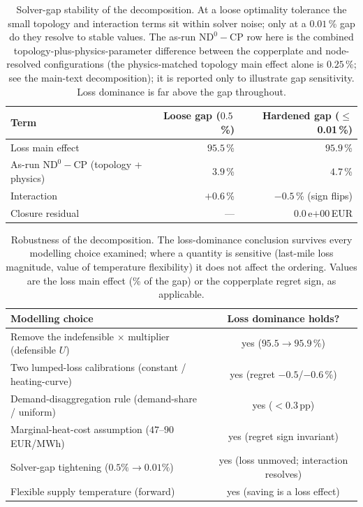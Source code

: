 \documentclass[11pt,a4paper]{article}
\newcommand{\CP}{\ensuremath{\mathrm{CP}}}
\newcommand{\NDz}{\ensuremath{\mathrm{ND^{0}}}}
\begin{document}
\begin{table}[t]
\centering
\caption{Solver-gap stability of the decomposition. At a loose optimality tolerance the
small topology and interaction terms sit within solver noise; only at a
$0.01$\,\% gap do they resolve to stable values. The as-run $\NDz\!-\!\CP$ row here is the
combined topology-plus-physics-parameter difference between the copperplate and node-resolved
configurations (the physics-matched topology main effect alone is $0.25$\,\%; see the main-text
decomposition); it is reported only to illustrate gap sensitivity. Loss dominance is far above the
gap throughout.}
\label{tab:gapstability}
\begin{tabular}{lrr}
\hline
Term & Loose gap ($0.5$\,\%) & Hardened gap ($\le$0.01\,\%) \\
\hline
Loss main effect & $95.5$\,\% & $95.9$\,\% \\
As-run $\NDz\!-\!\CP$ (topology + physics) & $3.9$\,\% & $4.7$\,\% \\
Interaction & $+0.6$\,\% & $-0.5$\,\% (sign flips) \\
Closure residual & --- & $0.0$\,e${+}00$\,EUR \\
\hline
\end{tabular}
\end{table}
\begin{table}[t]
\centering
\caption{Robustness of the decomposition. The loss-dominance conclusion survives every modelling
choice examined; where a quantity is sensitive (last-mile loss magnitude, value of temperature
flexibility) it does not affect the ordering. Values are the loss main effect (\% of the gap) or
the copperplate regret sign, as applicable.}
\label{tab:robustness}
\begin{tabular}{lc}
\hline
Modelling choice & Loss dominance holds? \\
\hline
Remove the indefensible $\times$ multiplier (defensible $U$) & yes ($95.5\!\to\!95.9$\,\%) \\
Two lumped-loss calibrations (constant / heating-curve) & yes (regret $-0.5$/$-0.6$\,\%) \\
Demand-disaggregation rule (demand-share / uniform) & yes ($<0.3$\,pp) \\
Marginal-heat-cost assumption ($47$--$90$\,EUR/MWh) & yes (regret sign invariant) \\
Solver-gap tightening ($0.5\% \to 0.01\%$) & yes (loss unmoved; interaction resolves) \\
Flexible supply temperature (forward) & yes (saving is a loss effect) \\
\hline
\end{tabular}
\end{table}
\end{document}
